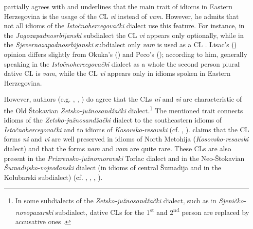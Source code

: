 
\noindent \citet[63, 72]{Okuka08} partially agrees with \citet[196f]{Peco07a} and underlines that the main trait of idioms in Eastern Herzegovina is the usage of the CL \textit{vi} instead of \textit{vam}. However, he admits that not all idioms of the \textit{Istočnohercegovački} dialect use this feature. For instance, in the \textit{Jugozapadnosrbijanski} subdialect the CL \textit{vi} appears only optionally, while in the \textit{Sjevernozapadnosrbijanski} subdialect only \textit{vam} is used as a CL \citep[cf.][78]{Okuka08}. Lisac's (\citeyear[103]{Lisac03}) opinion differs slightly from Okuka's (\citeyear{Okuka08}) and Peco's (\citeyear{Peco07a}); according to him, generally speaking in the \textit{Istočnohercegovački} dialect as a whole the second person plural dative CL is \textit{vam}, while the CL \textit{vi} appears only in idioms spoken in Eastern Herzegovina. 

However, authors (e.g. \citealt[88]{Barjaktarevic66}, \citealt[121]{Lisac03}, \citealt[177]{Okuka08}) do agree that the CLs \textit{ni} and \textit{vi} are characteristic of the Old Štokavian \textit{Zetsko-južnosandžački} dialect.\footnote{In some subdialects of the \textit{Zetsko-južnosandžački} dialect, such as in \textit{Sjeničko-novopazarski} subdialect, dative CLs for the 1\textsuperscript{st} and 2\textsuperscript{nd} person are replaced by accusative ones \citep[cf.][186]{Okuka08}.} The mentioned trait connects idioms of the \textit{Zet\-sko-juž\-no\-san\-džački} dialect to the southeastern idioms of \textit{Istočnohercegovački} and to idioms of \textit{Kosovsko-resavski} (cf. \citealt[121]{Lisac03}, \citealt[205]{Okuka08}). \citet[221]{ Bukumiric03} claims that the CL forms \textit{ni} and \textit{vi} are well preserved in idioms of North Metohija (\textit{Kosovsko-resavski} dialect) and that the forms \textit{nam} and \textit{vam} are quite rare. These CLs are also present in the \textit{Prizrensko-južnomoravski} Torlac dialect and in the Neo-Štokavian \textit{Šumadijsko-vojvođanski} dialect (in idioms of central Šumadija and in the Kolubarski subdialect) (cf. \citealt[110]{Stevanovic50}, \citealt[46]{Mladenovic10}, \citealt[291]{Remetic85}, \citealt[141, 237]{Okuka08}).

